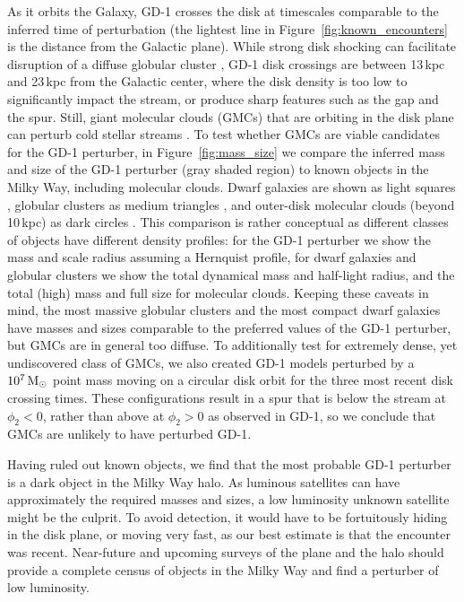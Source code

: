 \documentclass[twocolumn]{aastex62}
\begin{document}
As it orbits the Galaxy, GD-1 crosses the disk at timescales comparable to the inferred time of perturbation (the lightest line in Figure~\ref{fig:known_encounters} is the distance from the Galactic plane).
While strong disk shocking can facilitate disruption of a diffuse globular cluster \citep{dehnen2004}, GD-1 disk crossings are between 13\,kpc and 23\,kpc from the Galactic center, where the disk density is too low to significantly impact the stream, or produce sharp features such as the gap and the spur.
Still, giant molecular clouds (GMCs) that are orbiting in the disk plane can perturb cold stellar streams \citep{amorisco2016}.
To test whether GMCs are viable candidates for the GD-1 perturber, in Figure~\ref{fig:mass_size} we compare the inferred mass and size of the GD-1 perturber (gray shaded region) to known objects in the Milky Way, including molecular clouds.
Dwarf galaxies are shown as light squares \citep{mcconnachie2012}, globular clusters as medium triangles \citep{baumgardt2018}, and outer-disk molecular clouds (beyond 10\,kpc) as dark circles \citep{md2017}.
This comparison is rather conceptual as different classes of objects have different density profiles: for the GD-1 perturber we show the mass and scale radius assuming a Hernquist profile, for dwarf galaxies and globular clusters we show the total dynamical mass and half-light radius, and the total (high) mass and full size for molecular clouds.
Keeping these caveats in mind, the most massive globular clusters and the most compact dwarf galaxies have masses and sizes comparable to the preferred values of the GD-1 perturber, but GMCs are in general too diffuse.
To additionally test for extremely dense, yet undiscovered class of GMCs, we also created GD-1 models perturbed by a $10^7\,\rm M_\odot$ point mass moving on a circular disk orbit for the three most recent disk crossing times.
These configurations result in a spur that is below the stream at $\phi_2<0$, rather than above at $\phi_2>0$ as observed in GD-1, so we conclude that GMCs are unlikely to have perturbed GD-1.

Having ruled out known objects, we find that the most probable GD-1 perturber is a dark object in the Milky Way halo.
As luminous satellites can have approximately the required masses and sizes, a low luminosity unknown satellite might be the culprit.
To avoid detection, it would have to be fortuitously hiding in the disk plane, or moving very fast, as our best estimate is that the encounter was recent.
Near-future and upcoming surveys of the plane \citep{schlafly2018} and the halo \citep{lsst} should provide a complete census of objects in the Milky Way and find a perturber of low luminosity.
\end{document}
